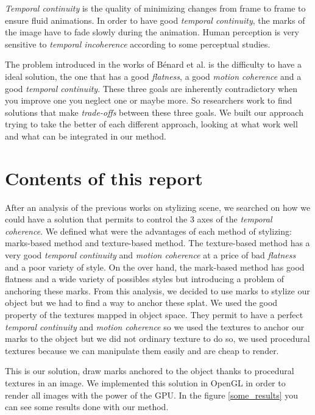 \textit{Temporal continuity} is the quality of minimizing changes from frame to frame to ensure fluid animations. In order to have good \textit{temporal continuity}, the marks of the image have to fade slowly during the animation. Human perception is very sensitive to \textit{temporal incoherence} according to some perceptual studies\cite{percept_studies, Schwarz_2009}. \newline


The problem introduced in the works of Bénard et al.\cite{benard_state---art_2011} is the difficulty to have a ideal solution, the one that has a good \textit{flatness}, a good \textit{motion coherence} and a good \textit{temporal continuity}. These three goals are inherently contradictory when you improve one you neglect one or maybe more. So researchers work to find solutions that make \textit{trade-offs} between these three goals. We built our approach trying to take the better of each different approach, looking at what work well and what can be integrated in our method.

\section{Contents of this report}

After an analysis of the previous works on stylizing scene, we searched on how we could have a solution that permits to control the 3 axes of the \textit{temporal coherence}. We defined what were the advantages of each method of stylizing: marks-based method and texture-based method. The texture-based method has a very good \textit{temporal continuity} and \textit{motion coherence} at a price of bad \textit{flatness} and a poor variety of style. On the over hand, the mark-based method has good flatness and a wide variety of possibles styles but introducing a problem of anchoring these marks. From this analysis, we decided to use marks to stylize our object but we had to find a way to anchor these splat. We used the good property of the textures mapped in object space. They permit to have a perfect \textit{temporal continuity} and \textit{motion coherence} so we used the textures to anchor our marks to the object but we did not ordinary texture to do so, we used procedural textures because we can manipulate them easily and are cheap to render. \newline

This is our solution, draw marks anchored to the object thanks to procedural textures in an image. We implemented this solution in OpenGL in order to render all images with the power of the GPU. In the figure \ref{some_results} you can see some results done with our method.

